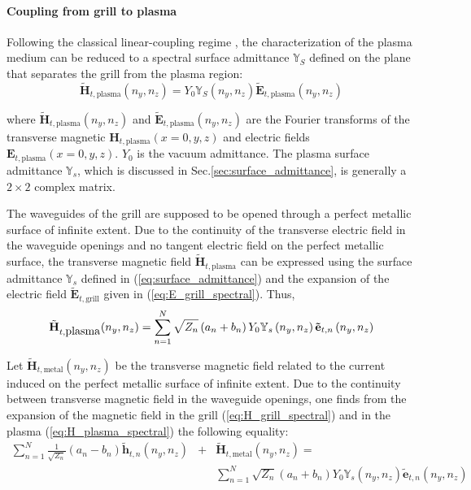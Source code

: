 \paragraph{Coupling from grill to plasma}

Following the classical linear-coupling regime \cite{brambilla1979,bers1983}, the characterization of the plasma medium can be reduced to a spectral surface admittance $\mathbb{Y}_{S}$ defined on the plane that separates the grill from the plasma region:
\begin{equation}
\tilde{\mathbf{H}}_{t,\mbox{plasma}}\left(n_{y},n_{z}\right)=Y_{0}\mathbb{Y}_{S}\left(n_{y},n_{z}\right)\tilde{\mathbf{E}}_{t,\mbox{plasma}}\left(n_{y},n_{z}\right)\label{eq:surface_admittance}
\end{equation}

where $\tilde{\mathbf{H}}_{t,\mbox{plasma}}\left(n_{y},n_{z}\right)$ and $\tilde{\mathbf{E}}_{t,\mbox{plasma}}\left(n_{y},n_{z}\right)$ are the Fourier transforms of the transverse magnetic $\mathbf{H}_{t,\mbox{plasma}}(x=0,y,z)$ and electric fields $\mathbf{E}_{t,\mbox{plasma}}(x=0,y,z)$. $Y_{0}$ is the vacuum admittance. The plasma surface admittance $\mathbb{Y}_{s}$, which is discussed in Sec.\ref{sec:surface_admittance}, is generally
a $2\times2$ complex matrix.

The waveguides of the grill are supposed to be opened through a perfect metallic surface of infinite extent. Due to the continuity of the transverse electric field in the waveguide openings and no tangent electric field on the perfect metallic surface, the transverse magnetic field $\mathbf{\tilde{H}}_{t,\mbox{plasma}}$ can be expressed using the surface admittance $\mathbb{Y}_{s}$ defined in (\ref{eq:surface_admittance}) and the expansion of the electric field $\mathbf{\tilde{E}}_{t,\mbox{grill}}$ given in (\ref{eq:E_grill_spectral}). Thus, 
\begin{equation}
\tilde{\mathbf{H}}_{t,\mbox{plasma}}\mbox{\ensuremath{\left(n_{y},n_{z}\right)}}=\sum_{n=1}^{N}\sqrt{Z_{n}}\left(a_{n}+b_{n}\right)Y_{0}\mathbb{Y}_{s}\left(n_{y},n_{z}\right)\mathbf{\tilde{e}}_{t,n}\left(n_{y},n_{z}\right)\label{eq:H_plasma_spectral}
\end{equation}

Let $\tilde{\mathbf{H}}_{t,\mbox{metal}}\left(n_{y},n_{z}\right)$ be the transverse magnetic field related to the current induced on the perfect metallic surface of infinite extent. Due to the continuity between transverse magnetic field in the waveguide openings, one finds from the expansion of the magnetic field in the grill (\ref{eq:H_grill_spectral}) and in the plasma (\ref{eq:H_plasma_spectral}) the following equality:
\begin{eqnarray}
\sum_{n=1}^{N}\frac{1}{\sqrt{Z_{n}}}\left(a_{n}-b_{n}\right)\tilde{\mathbf{h}}_{t,n}\left(n_{y},n_{z}\right) & + & \tilde{\mathbf{H}}_{t,\mbox{metal}}\left(n_{y},n_{z}\right)=\label{eq:H_continuity_spectral}\\
&  & \sum_{n=1}^{N}\sqrt{Z_{n}}\left(a_{n}+b_{n}\right)Y_{0}\mathbb{Y}_{s}\left(n_{y},n_{z}\right)\mathbf{\tilde{e}}_{t,n}\left(n_{y},n_{z}\right)\nonumber 
\end{eqnarray}

